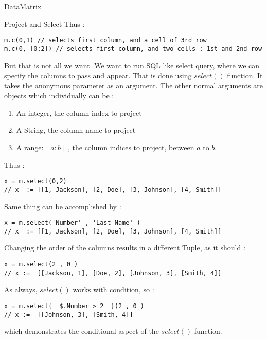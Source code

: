 \begin{section}{DataMatrix}
\begin{subsection}{Project and Select}
Thus :

\begin{lstlisting}[style=JexlStyle]
m.c(0,1) // selects first column, and a cell of 3rd row 
m.c(0, [0:2]) // selects first column, and two cells : 1st and 2nd row 
\end{lstlisting}

But that is not all we want. We want to run SQL like select query, where
we can specify the columns to pass and appear. That is done using $select()$ function.
It takes the anonymous parameter as an argument. 
The other normal arguments are objects which individually can be :

\begin{enumerate}
\item{ An integer, the column index to project }
\item{ A String, the column name to project }
\item{ A range: $[a:b]$ , the column indices to project, between $a$ to $b$. }
\end{enumerate}

Thus :

\begin{lstlisting}[style=JexlStyle]
x = m.select(0,2)
// x  := [[1, Jackson], [2, Doe], [3, Johnson], [4, Smith]] 
\end{lstlisting}

Same thing can be accomplished by :

\begin{lstlisting}[style=JexlStyle]
x = m.select('Number' , 'Last Name' )
// x  := [[1, Jackson], [2, Doe], [3, Johnson], [4, Smith]] 
\end{lstlisting}

Changing the order of the columns results in a different Tuple, 
as it should :

\begin{lstlisting}[style=JexlStyle]
x = m.select(2 , 0 )
// x :=  [[Jackson, 1], [Doe, 2], [Johnson, 3], [Smith, 4]]
\end{lstlisting}

As always, $select()$ works with condition, so :

\begin{lstlisting}[style=JexlStyle]
x = m.select{  $.Number > 2  }(2 , 0 )
// x :=  [[Johnson, 3], [Smith, 4]]
\end{lstlisting}
which demonstrates the conditional aspect of the $select()$ function.


\end{subsection}
\end{section}
